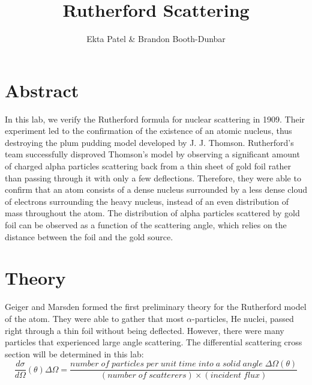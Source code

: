 
\newcommand{\ig}[2][width=4in]{\texttt{[image: \#2]}}    		
\usepackage{graphicx}					
\usepackage{amssymb}
\usepackage{pgfplotstable}
\usepackage{float}
\usepackage{caption}
\captionsetup[table]{justification=justified,singlelinecheck=false, position=bottom}


\header {\today}							
\title{Rutherford Scattering}
\author{Ekta Patel \& Brandon Booth-Dunbar}

\section{Abstract}
\begin{em} In this lab, we verify the Rutherford formula for nuclear scattering in 1909. Their experiment led to the confirmation of the existence of an atomic nucleus, thus destroying the plum pudding model  developed by J. J. Thomson. Rutherford's team successfully disproved Thomson's model by observing a significant amount of charged alpha particles scattering back from a thin sheet of gold foil rather than passing through it with only a few deflections. Therefore, they were able to confirm that an atom consists of a dense nucleus surrounded by a less dense cloud of electrons surrounding the heavy nucleus, instead of an even distribution of mass throughout the atom. The distribution of alpha particles scattered by gold foil can be observed as a function of the scattering angle, which relies on the distance between the foil and the gold source. \end {em}

\section{Theory}
Geiger and Marsden formed the first preliminary theory for the Rutherford model of the atom. They were able to gather that most $\alpha$-particles, He nuclei, passed right through a thin foil without being deflected. However, there were many particles that experienced large angle scattering. The differential scattering cross section will be determined in this lab: 
\begin{equation} \frac{d\sigma}{d\Omega}(\theta)\Delta\Omega=\frac{number\;of\; particles\; per\; unit\; time\;into\;a \;solid\; angle\; \Delta\Omega(\theta)}{(number \;of\; scatterers)\times (incident\; flux)} \end{equation}

